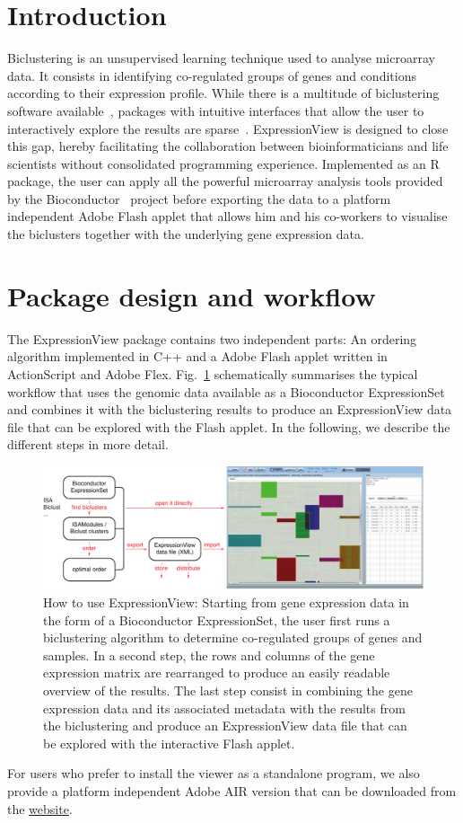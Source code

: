 \documentclass[round]{bioinfo}
\begin{document}
\section{Introduction}
Biclustering is an unsupervised learning technique used to analyse microarray data. It consists in identifying co-regulated groups of genes and conditions according to their expression profile. While there is a multitude of biclustering software available~\citep{madeira04}, packages with intuitive interfaces that allow the user to interactively explore the results are sparse~\citep{santamaria08}. ExpressionView is designed to close this gap, hereby facilitating the collaboration between bioinformaticians and life scientists without consolidated programming experience. Implemented as an R package, the user can apply all the powerful microarray analysis tools provided by the Bioconductor~\citep{gentleman04} project before exporting the data to a platform independent Adobe Flash applet that allows him and his co-workers to visualise the biclusters together with the underlying gene expression data.

\section{Package design and workflow}
The ExpressionView package contains two independent parts: An ordering algorithm implemented in C++ and a Adobe Flash applet written in ActionScript and Adobe Flex. Fig.~\ref{fig:workflow} schematically summarises the typical workflow that uses the genomic data available as a Bioconductor ExpressionSet and combines it with the biclustering results to produce an ExpressionView data file that can be explored with the Flash applet. In the following, we describe the different steps in more detail.
\begin{figure}[!tpb]
\centerline{\includegraphics[width=\linewidth]{fig1-crop}}
\caption{How to use ExpressionView: Starting from gene expression data in the form of a Bioconductor ExpressionSet, the user first runs a biclustering algorithm to determine co-regulated groups of genes and samples. In a second step, the rows and columns of the gene expression matrix are rearranged to produce an easily readable overview of the results. The last step consist in combining the gene expression data and its associated metadata with the results from the biclustering and produce an ExpressionView data file that can be explored with the interactive Flash applet.}\label{fig:workflow}
\end{figure}
For users who prefer to install the viewer as a standalone program, we also provide a platform independent Adobe AIR version that can be downloaded from the \href{http://maya:7575/ExpressionView}{website}.
\end{document}
